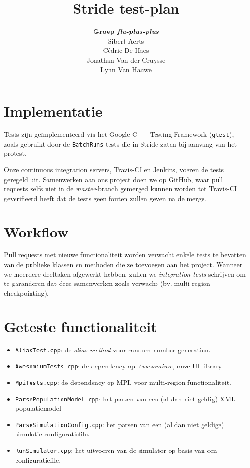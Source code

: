 \documentclass[10pt,a4paper]{article}
\author{\textbf{Groep \emph{flu-plus-plus}} \\ Sibert Aerts \\ Cédric De Haes \\ Jonathan Van der Cruysse \\ Lynn Van Hauwe}
\title{Stride test-plan}
\begin{document}
	\newcommand{\titleitem}[1]{\item \textbf{#1}}
	\maketitle
	\section{Implementatie}
	Tests zijn ge\"implementeerd via het Google C++ Testing Framework (\texttt{gtest}), zoals gebruikt door de \texttt{BatchRuns} tests die in Stride zaten bij aanvang van het protest.

	Onze continuous integration servers, Travis-CI en Jenkins, voeren de tests geregeld uit. Samenwerken aan ons project doen we op GitHub, waar pull requests zelfs niet in de \textit{master}-branch gemerged kunnen worden tot Travis-CI geverifieerd heeft dat de tests geen fouten zullen geven na de merge.

	\section{Workflow}
	Pull requests met nieuwe functionaliteit worden verwacht enkele tests te bevatten van de publieke klassen en methoden die ze toevoegen aan het project. Wanneer we meerdere deeltaken afgewerkt hebben, zullen we \textit{integration tests} schrijven om te garanderen dat deze samenwerken zoals verwacht (bv. multi-region checkpointing).

	\section{Geteste functionaliteit}
	\begin{itemize}
		\item \texttt{AliasTest.cpp}: de \textit{alias method} voor random number generation.
		\item \texttt{AwesomiumTests.cpp}: de dependency op \textit{Awesomium}, onze UI-library.
		\item \texttt{MpiTests.cpp}: de dependency op MPI, voor multi-region functionaliteit.
		\item \texttt{ParsePopulationModel.cpp}: het parsen van een (al dan niet geldig) XML-populatiemodel.
		\item \texttt{ParseSimulationConfig.cpp}: het parsen van een (al dan niet geldige) simulatie-configuratiefile.
		\item \texttt{RunSimulator.cpp}: het uitvoeren van de simulator op basis van een configuratiefile.
	\end{itemize}
\end{document}
